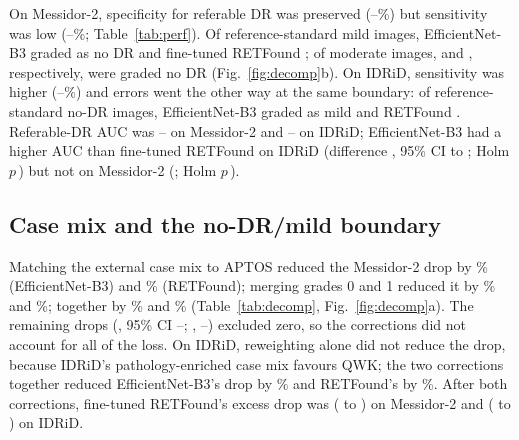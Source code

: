 \documentclass[pdflatex,sn-basic,Numbered]{sn-jnl}
\begin{document}
On Messidor-2, specificity for referable DR was preserved (--\%) but sensitivity was low (--\%; Table~\ref{tab:perf}). Of  reference-standard mild images, EfficientNet-B3 graded  as no DR and fine-tuned RETFound ; of  moderate images,  and , respectively, were graded no DR (Fig.~\ref{fig:decomp}b). On IDRiD, sensitivity was higher (--\%) and errors went the other way at the same boundary: of  reference-standard no-DR images, EfficientNet-B3 graded  as mild and RETFound . Referable-DR AUC was -- on Messidor-2 and -- on IDRiD; EfficientNet-B3 had a higher AUC than fine-tuned RETFound on IDRiD (difference , 95\% CI  to ; Holm $p$\,) but not on Messidor-2 (; Holm $p$\,).

\subsection{Case mix and the no-DR/mild boundary}

Matching the external case mix to APTOS reduced the Messidor-2 drop by \% (EfficientNet-B3) and \% (RETFound); merging grades 0 and 1 reduced it by \% and \%; together by \% and \% (Table~\ref{tab:decomp}, Fig.~\ref{fig:decomp}a). The remaining drops (, 95\% CI --; , --) excluded zero, so the corrections did not account for all of the loss. On IDRiD, reweighting alone did not reduce the drop, because IDRiD's pathology-enriched case mix favours QWK; the two corrections together reduced EfficientNet-B3's drop by \% and RETFound's by \%. After both corrections, fine-tuned RETFound's excess drop was  ( to ) on Messidor-2 and  ( to ) on IDRiD.
\end{document}
